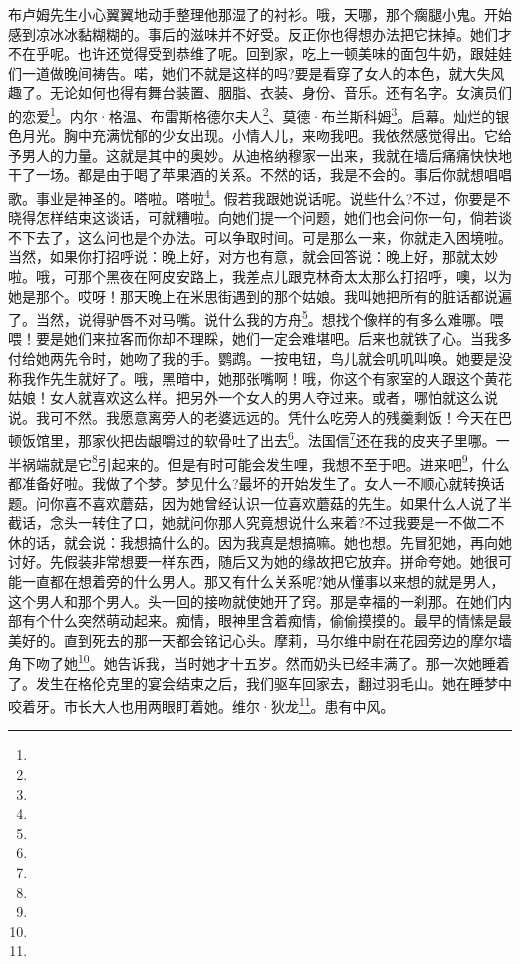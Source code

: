 \par 布卢姆先生小心翼翼地动手整理他那湿了的衬衫。哦，天哪，那个瘸腿小鬼。开始感到凉冰冰黏糊糊的。事后的滋味并不好受。反正你也得想办法把它抹掉。她们才不在乎呢。也许还觉得受到恭维了呢。回到家，吃上一顿美味的面包牛奶，跟娃娃们一道做晚间祷告。喏，她们不就是这样的吗?要是看穿了女人的本色，就大失风趣了。无论如何也得有舞台装置、胭脂、衣装、身份、音乐。还有名字。女演员们的恋爱\footnote{}。内尔·格温、布雷斯格德尔夫人\footnote{}、莫德·布兰斯科姆\footnote{}。启幕。灿烂的银色月光。胸中充满忧郁的少女出现。小情人儿，来吻我吧。我依然感觉得出。它给予男人的力量。这就是其中的奥妙。从迪格纳穆家一出来，我就在墙后痛痛快快地干了一场。都是由于喝了苹果酒的关系。不然的话，我是不会的。事后你就想唱唱歌。事业是神圣的。嗒啦。嗒啦\footnote{}。假若我跟她说话呢。说些什么?不过，你要是不晓得怎样结束这谈话，可就糟啦。向她们提一个问题，她们也会问你一句，倘若谈不下去了，这么问也是个办法。可以争取时间。可是那么一来，你就走入困境啦。当然，如果你打招呼说：晚上好，对方也有意，就会回答说：晚上好，那就太妙啦。哦，可那个黑夜在阿皮安路上，我差点儿跟克林奇太太那么打招呼，噢，以为她是那个。哎呀！那天晚上在米思街遇到的那个姑娘。我叫她把所有的脏话都说遍了。当然，说得驴唇不对马嘴。说什么我的方舟\footnote{}。想找个像样的有多么难哪。喂喂！要是她们来拉客而你却不理睬，她们一定会难堪吧。后来也就铁了心。当我多付给她两先令时，她吻了我的手。鹦鹉。一按电钮，鸟儿就会叽叽叫唤。她要是没称我作先生就好了。哦，黑暗中，她那张嘴啊！哦，你这个有家室的人跟这个黄花姑娘！女人就喜欢这么样。把另外一个女人的男人夺过来。或者，哪怕就这么说说。我可不然。我愿意离旁人的老婆远远的。凭什么吃旁人的残羹剩饭！今天在巴顿饭馆里，那家伙把齿龈嚼过的软骨吐了出去\footnote{}。法国信\footnote{}还在我的皮夹子里哪。一半祸端就是它\footnote{}引起来的。但是有时可能会发生哩，我想不至于吧。进来吧\footnote{}，什么都准备好啦。我做了个梦。梦见什么?最坏的开始发生了。女人一不顺心就转换话题。问你喜不喜欢蘑菇，因为她曾经认识一位喜欢蘑菇的先生。如果什么人说了半截话，念头一转住了口，她就问你那人究竟想说什么来着?不过我要是一不做二不休的话，就会说：我想搞什么的。因为我真是想搞嘛。她也想。先冒犯她，再向她讨好。先假装非常想要一样东西，随后又为她的缘故把它放弃。拼命夸她。她很可能一直都在想着旁的什么男人。那又有什么关系呢?她从懂事以来想的就是男人，这个男人和那个男人。头一回的接吻就使她开了窍。那是幸福的一刹那。在她们内部有个什么突然萌动起来。痴情，眼神里含着痴情，偷偷摸摸的。最早的情愫是最美好的。直到死去的那一天都会铭记心头。摩莉，马尔维中尉在花园旁边的摩尔墙角下吻了她\footnote{}。她告诉我，当时她才十五岁。然而奶头已经丰满了。那一次她睡着了。发生在格伦克里的宴会结束之后，我们驱车回家去，翻过羽毛山。她在睡梦中咬着牙。市长大人也用两眼盯着她。维尔·狄龙\footnote{}。患有中风。
